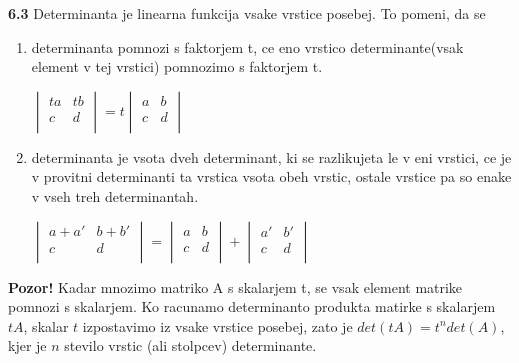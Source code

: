 \documentclass{article}
\begin{document}
\begin{multicols}{3}
\textbf{6.3} Determinanta je linearna funkcija vsake vrstice posebej. To pomeni, da se
\begin{enumerate}
    \item determinanta pomnozi s faktorjem t, ce eno vrstico determinante(vsak element v tej vrstici)
    pomnozimo s faktorjem t.
    \begin{center}
        \begin{math}
            \begin{vmatrix}
                ta & tb\\
                c  & d\\
            \end{vmatrix}
            = t
            \begin{vmatrix}
                a & b\\
                c & d\\
            \end{vmatrix}
        \end{math}
    \end{center}
    \item determinanta je vsota dveh determinant, ki se razlikujeta le v eni vrstici,
    ce je v provitni determinanti ta vrstica vsota obeh vrstic, ostale vrstice pa so enake
    v vseh treh determinantah.
    \begin{center}
        \begin{math}
            \begin{vmatrix}
                a + a' & b + b'\\
                c      &      d\\
            \end{vmatrix} =
            \begin{vmatrix}
                a & b\\
                c & d\\
            \end{vmatrix} +
            \begin{vmatrix}
                a' & b'\\
                c & d\\
            \end{vmatrix}
        \end{math}
    \end{center}
\end{enumerate}

\textbf{Pozor!} Kadar mnozimo matriko A s skalarjem t, se vsak element matrike pomnozi s skalarjem.
Ko racunamo determinanto produkta matirke s skalarjem $tA$, skalar $t$ izpostavimo iz vsake vrstice posebej,
zato je $det(tA) = t^{n}det(A)$, kjer je $n$ stevilo vrstic (ali stolpcev) determinante.


\end{multicols}
\end{document}
